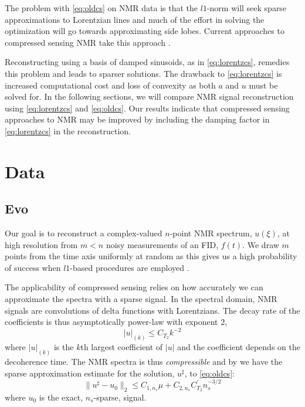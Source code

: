 \documentclass[11pt]{article}
\begin{document}
The problem with \cref{eq:oldcs} on NMR data is that the $l1$-norm will seek sparse approximations to Lorentzian lines and much of the effort in solving the optimization will go towards approximating side lobes. Current approaches to compressed sensing NMR take this approach \cite{Kazimierczuk2011} \cite{Hyberts2012} \cite{Drori2007a} \cite{Shrot2011} \cite{Hu} \cite{Qu2011}.

Reconstructing using a basis of damped sinusoids, as in \cref{eq:lorentzcs}, remedies this problem and leads to sparser solutions. The drawback to \cref{eq:lorentzcs} is increased computational cost and loss of convexity as both $a$ and $u$ must be solved for. In the following sections, we will compare NMR signal reconstruction using \cref{eq:lorentzcs} and \cref{eq:oldcs}. Our results indicate that compressed sensing approaches to NMR may be improved by including the damping factor in \cref{eq:lorentzcs} in the reconstruction.

\section{Data}

\subsection{Evo}

Our goal is to reconstruct a complex-valued $n$-point NMR spectrum, $u(\xi)$, at high resolution from $m < n$ noisy measurements of an FID, $f(t)$. We draw $m$ points from the time axis uniformly at random as this gives us a high probability of success when $l1$-based procedures are employed \cite{Candes2005}.

The applicability of compressed sensing relies on how accurately we can approximate the spectra with a sparse signal. In the spectral domain, NMR signals are convolutions of delta functions with Lorentzians. The decay rate of the coefficients is thus asymptotically power-law with exponent $2$,
\begin{equation}\label{eq:powerlaw}
|u|_{(k)} \leq C_{T_2} k^{-2}
\end{equation}
where $|u|_{(k)}$ is the $k$th largest coefficient of $|u|$ and the coefficient depends on the decoherence time. The NMR spectra is thus {\it compressible} and by \cite{Candes2005a} we have the sparse approximation estimate for the solution, $u^\sharp$, to \cref{eq:oldcs}:
\begin{equation}\label{eq:taoerror}
\|u^\sharp - u_0\|_2 \leq C_{1,n_s}\mu + C_{2,n_s} C_{T_2}^'n_s^{-3/2}
\end{equation}
where $u_0$ is the exact, $n_s$-sparse, signal.
\end{document}
